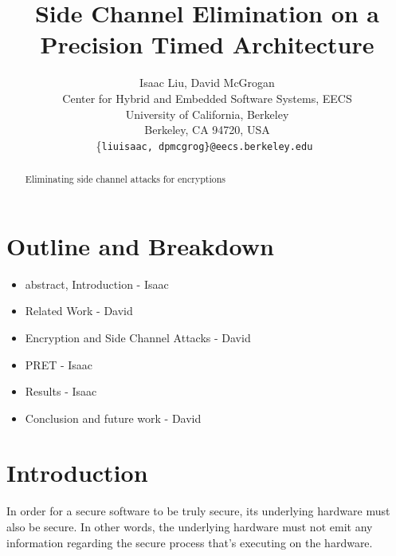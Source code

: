 \documentclass[times, 10pt,twocolumn]{article}
\begin{document}
  \title{Side Channel Elimination on a Precision Timed Architecture}

  \author{Isaac Liu, David McGrogan \\
    Center for Hybrid and Embedded Software Systems, EECS \\
    University of California, Berkeley \\
    Berkeley, CA 94720, USA \\
    \{\tt liuisaac, dpmcgrog\}@eecs.berkeley.edu
  }


\maketitle
\thispagestyle{empty}

\begin{abstract}
Eliminating side channel attacks for encryptions
\end{abstract}


\section{Outline and Breakdown}
\begin{itemize}
\item abstract, Introduction  - Isaac
\item Related Work - David
\item Encryption and Side Channel Attacks - David
\item PRET  - Isaac 
\item Results  - Isaac
\item Conclusion and future work - David
\end{itemize}

\section{Introduction}
In order for a secure software to be truly secure, its underlying hardware must also be secure. In other words, the underlying hardware must not emit any information regarding the secure process that's executing on the hardware. 
\end{document}
